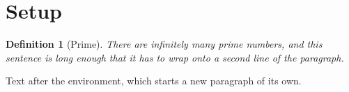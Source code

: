 \documentclass[12pt]{article}
\newtheorem{definition}{Definition}[section]
\begin{document}
\section{Setup}
\begin{definition}[Prime]
There are infinitely many prime numbers, and this sentence is long enough that it has to wrap onto a second line of the paragraph.
\end{definition}
Text after the environment, which starts a new paragraph of its own.
\end{document}
